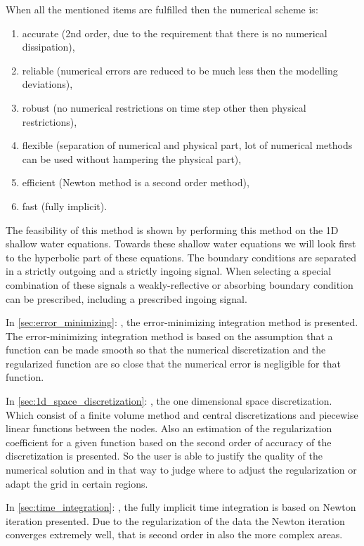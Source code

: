When all the mentioned items are fulfilled then the numerical scheme is:
\begin{enumerate}
\item accurate (2nd order, due to the requirement that there is no numerical dissipation),
\item reliable (numerical errors are reduced to be much less then the modelling deviations),
\item robust (no numerical restrictions on time step other then physical restrictions),
\item flexible (separation of numerical and physical part, lot of numerical methods can be used without hampering the physical part),
\item efficient (Newton method is a second order method),
\item fast (fully implicit).
\end{enumerate}

The feasibility of this method is shown by performing this method on the 1D shallow water equations.
Towards these shallow water equations we will look first to the hyperbolic part of these equations.
The boundary conditions are separated in a strictly outgoing and a strictly ingoing signal.
When selecting a special combination of these signals a weakly-reflective or absorbing boundary condition can be prescribed, including a prescribed ingoing signal.




In \autoref{sec:error_minimizing}: , the error-minimizing integration method is presented.
The error-minimizing integration method is based on the assumption that a function can be made smooth so that the numerical discretization and the regularized function are so close that the numerical error is negligible for that function.

In \autoref{sec:1d_space_discretization}: , the one dimensional space discretization.
Which consist of a finite volume method and central discretizations and piecewise linear functions between the nodes.
Also an estimation of the regularization coefficient for a given function based on the second order of accuracy of the discretization is presented.
So the user is able to justify the quality of the numerical solution and in that way to judge where to adjust the regularization or adapt the grid in certain regions.


In \autoref{sec:time_integration}: , the fully implicit time integration is based on Newton iteration presented. Due to the regularization of the data the Newton iteration converges extremely well, that is second order in also the more complex areas.

